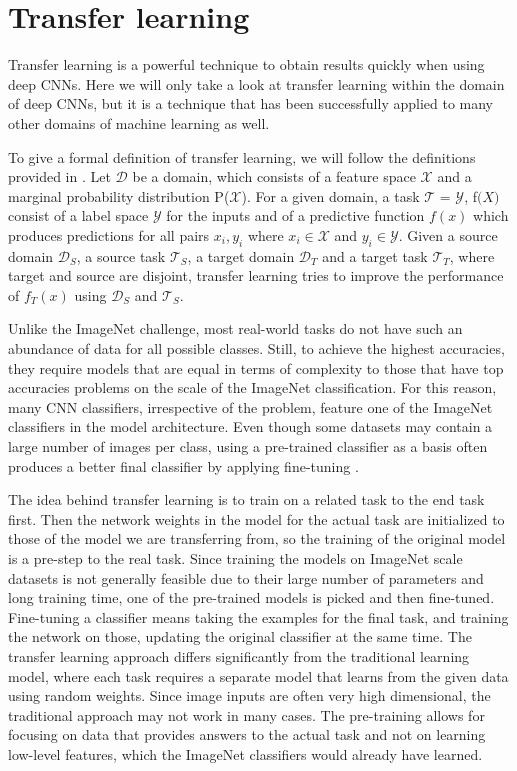 \section{Transfer learning}
Transfer learning is a powerful technique to obtain results quickly when using deep CNNs. Here we will only take a look at transfer learning within the domain of deep CNNs, but it is a technique that has been successfully applied to many other domains of machine learning as well.

To give a formal definition of transfer learning, we will follow the definitions provided in \citep{transferSurvey2010}. Let $\mathcal{D}$ be a domain, which consists of a feature space $\mathcal{X}$ and a marginal probability distribution P($\mathcal{X}$). For a given domain, a task $\mathcal{T}$ = {$\mathcal{Y}$, f$\mathcal(X)$} consist of a label space $\mathcal{Y}$ for the inputs and of a predictive function $f(x)$ which produces predictions for all pairs ${x_i, y_i}$ where $x_i \in \mathcal{X}$ and $y_i \in \mathcal{Y}$. Given a source domain $\mathcal{D}_S$, a source task $\mathcal{T}_S$, a target domain $\mathcal{D}_T$ and a target task $\mathcal{T}_T$, where target and source are disjoint, transfer learning tries to improve the performance of $f_T(x)$ using $\mathcal{D}_S$ and $\mathcal{T}_S$.

Unlike the ImageNet challenge, most real-world tasks do not have such an abundance of data for all possible classes. Still, to achieve the highest accuracies, they require models that are equal in terms of complexity to those that have top accuracies problems on the scale of the ImageNet classification. For this reason, many CNN classifiers, irrespective of the problem, feature one of the ImageNet classifiers in the model architecture. Even though some datasets may contain a large number of images per class, using a pre-trained classifier as a basis often produces a better final classifier by applying fine-tuning \citep{betterTransfer}.

The idea behind transfer learning is to train on a related task to the end task first. Then the network weights in the model for the actual task are initialized to those of the model we are transferring from, so the training of the original model is a pre-step to the real task. Since training the models on ImageNet scale datasets is not generally feasible due to their large number of parameters and long training time, one of the pre-trained models is picked and then fine-tuned. Fine-tuning a classifier means taking the examples for the final task, and training the network on those, updating the original classifier at the same time. The transfer learning approach differs significantly from the traditional learning model, where each task requires a separate model that learns from the given data using random weights. Since image inputs are often very high dimensional, the traditional approach may not work in many cases. The pre-training allows for focusing on data that provides answers to the actual task and not on learning low-level features, which the ImageNet classifiers would already have learned.

